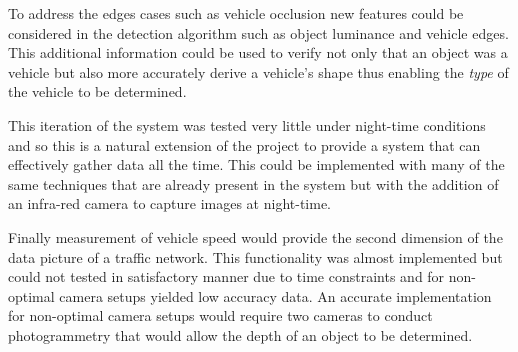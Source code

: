 To address the edges cases such as vehicle occlusion new features could be considered in the detection algorithm such as object luminance and vehicle edges. This additional information could be used to verify not only that an object was a vehicle but also more accurately derive a vehicle's shape thus enabling  the \emph{type} of the vehicle to be determined.

This iteration of the system was tested very little under night-time conditions and so this is a natural extension of the project to provide a system that can effectively gather data all the time. This could be implemented with many of the same techniques that are already present in the system but with the addition of an infra-red camera to capture images at night-time. 

Finally measurement of vehicle speed would provide the second dimension of the data picture of a traffic network. This functionality was almost implemented but could not tested in satisfactory manner due to time constraints and for non-optimal camera setups yielded low accuracy data. An accurate implementation for non-optimal camera setups would require two cameras to conduct photogrammetry that would allow the depth of an object to be determined. 